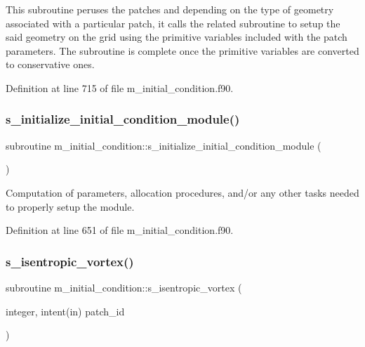 This subroutine peruses the patches and depending on the type of geometry associated with a particular patch, it calls the related subroutine to setup the said geometry on the grid using the primitive variables included with the patch parameters. The subroutine is complete once the primitive variables are converted to conservative ones. 



Definition at line 715 of file m\+\_\+initial\+\_\+condition.\+f90.

\mbox{\label{namespacem__initial__condition_a07a665ff41297455ac2da7b54243bac5}} 
\subsubsection{\texorpdfstring{s\+\_\+initialize\+\_\+initial\+\_\+condition\+\_\+module()}{s\_initialize\_initial\_condition\_module()}}
{\footnotesize\ttfamily subroutine m\+\_\+initial\+\_\+condition\+::s\+\_\+initialize\+\_\+initial\+\_\+condition\+\_\+module (\begin{DoxyParamCaption}{ }\end{DoxyParamCaption})}



Computation of parameters, allocation procedures, and/or any other tasks needed to properly setup the module. 



Definition at line 651 of file m\+\_\+initial\+\_\+condition.\+f90.

\mbox{\label{namespacem__initial__condition_ab329077796ad7579df0a96543263150d}} 
\subsubsection{\texorpdfstring{s\+\_\+isentropic\+\_\+vortex()}{s\_isentropic\_vortex()}}
{\footnotesize\ttfamily subroutine m\+\_\+initial\+\_\+condition\+::s\+\_\+isentropic\+\_\+vortex (\begin{DoxyParamCaption}\item[{integer, intent(in)}]{patch\+\_\+id }\end{DoxyParamCaption})}



